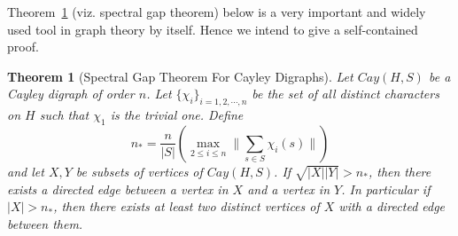 \documentclass[11pt,reqno]{amsart}
\newtheorem{thm}{Theorem}[section]
\begin{document}
Theorem~\ref{SGT} (viz. spectral gap theorem) below is a very important and widely used tool in graph theory by itself. Hence we intend to give a self-contained proof.

\begin{thm}[Spectral Gap Theorem For Cayley Digraphs] \label{SGT}
Let $Cay(H,S)$ be a Cayley digraph of order $n$. Let $\{ \chi_i \}_{i=1,2, \cdots, n}$ be the set of all distinct characters on $H$ such that $\chi_{1}$ is the trivial one. Define \[ n_{\ast}= \frac{n}{|S|} \left( \max_{2 \leqslant i \leqslant n} \Big\| \sum_{s \in S} \chi_{i}(s) \Big\| \right) \] and let $X,Y$ be subsets of vertices of $Cay(H,S)$. If $\sqrt{|X||Y|} > n_{\ast}$, then there exists a directed edge between a vertex in $X$ and a vertex in $Y$. In particular if $|X|> n_{\ast}$, then there exists at least two distinct vertices of $X$ with a directed edge between them.
\end{thm}
\end{document}
